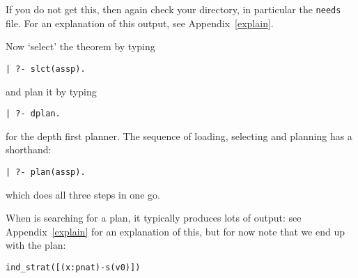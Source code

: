 \documentclass{article}
\begin{document}
If you do not get this, then again check your \clam directory,
in particular the {\tt needs} file.
For an explanation of this output, see Appendix~\ref{explain}.

Now `select' the theorem by typing
%
\begin{verbatim}
| ?- slct(assp).
\end{verbatim}
and plan it by typing
\begin{verbatim}
| ?- dplan.
\end{verbatim} 
for the depth first planner.  The sequence  of loading, selecting and
planning has a shorthand:
\begin{verbatim}
| ?- plan(assp).
\end{verbatim} 
which does all three steps in one go.  

When \clam is searching for a plan, it typically produces lots of
output: see Appendix~\ref{explain} for an explanation of this,
but for now note that we end up with the plan:

\begin{verbatim}
ind_strat([(x:pnat)-s(v0)])
\end{verbatim}
\end{document}
